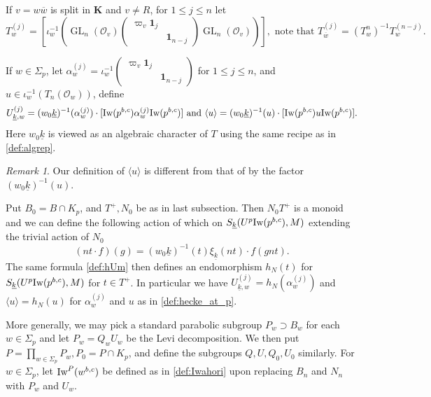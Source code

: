\documentclass[leqno]{amsart}
\newcommand{\wt}[1]{\underline{ #1 }}
\newcommand{\Iw}{\textnormal{Iw}}
\newcommand{\bw}{\overline{w}}
\DeclareMathOperator{\GL}{GL}
\newcommand{\id}{\mathbf{1}}
\newcommand{\K}{{\mathbf{K}}} %
\newcommand{\oo}{\mathcal{O}} %
\theoremstyle{definition}
\theoremstyle{remark}
\newtheorem{rem}[thm]{Remark}
\begin{document}
If $v=w\bw$ is split in  $\K$ and $v\neq R$,
for $1\leq j\leq n$ let 
\begin{equation}\label{def:hecke_away_p}
	T_w^{(j)}=
	\left[\iota_w^{-1}\left(
	\GL_n(\oo_v)
	\begin{pmatrix}
		\varpi_v\id_{j}&\\&\id_{n-j}
	\end{pmatrix}
	\GL_n(\oo_v)
	\right)\right],
	\text{ note that }
	T_{\bw}^{(j)}=(T_{w}^{{n}})^{-1}T_w^{(n-j)}.
\end{equation}

If $w\in \Sigma_p$, let  
$\alpha_w^{(j)}=\iota_w^{-1}
\left(\begin{smallmatrix}
\varpi_v\id_{j}&\\&\id_{n-j} 
\end{smallmatrix}\right)$ for $1\leq j\leq n$,
and $u\in \iota_w^{-1}(T_n(\oo_w))$, define
\begin{equation}\label{def:hecke_at_p}
	U_{\wt{k},w}^{(j)}=
	(w_0\wt{k})^{-1}(\alpha_{w}^{(j)})\cdot
	[\Iw(p^{b,c})\alpha_w^{(j)}\Iw(p^{b,c})]
	\text{ and }
	\langle u\rangle= (w_0\wt{k})^{-1}(u)\cdot 
	[\Iw(p^{b,c})u\Iw(p^{b,c})].
\end{equation}
Here $w_0\wt{k}$ is viewed as an algebraic character of $T$ 
using the same recipe as in \eqref{def:algrep}.
\begin{rem}
	Our definition of $\langle u\rangle$
	is different from that of \cite{ger}
	by the factor $(w_0\wt{k})^{-1}(u)$.
\end{rem}
Put $B_0=B\cap K_p$,
and $T^+, N_0$ be as in last subsection.
Then $N_0T^+$ is a monoid
and we can define the following action of which
on  $S_{\wt{k}}(U^p\Iw(p^{b,c}),M)$
extending the trivial action of $N_0$
\begin{equation}\label{def:T_act}
	(nt\cdot f)(g)=(w_0\wt{k})^{-1}(t)\xi_{\wt{k}}(nt)\cdot f(gnt).
\end{equation}
The same formula \eqref{def:hUm}
then defines an endomorphism $h_N(t)$
for $S_{\wt{k}}(U^p\Iw(p^{b,c}),M)$
for $t\in T^+$.
In particular we have
$U_{\wt{k},w}^{(j)}=h_N(\alpha_{w}^{(j)})$ and $\langle u\rangle= h_N(u)$
for $\alpha_w^{(j)}$ and $u$ as in \eqref{def:hecke_at_p}. 


More generally, 
we may pick a standard parabolic subgroup
$P_w\supset B_w$ for each  $w\in \Sigma_p$
and let  $P_w=Q_wU_w$ be the Levi decomposition.
We then put $P=\prod_{w\in \Sigma_p}P_w, P_0=P\cap K_p$,
and define the subgroups $Q,U, Q_0, U_0$ similarly.
For $w\in \Sigma_p$,
let  $\Iw^P(w^{b,c})$ 
be defined as in \eqref{def:Iwahori}
upon replacing $B_n$ and $N_n$
with $P_w$ and  $U_w$.
\end{document}
